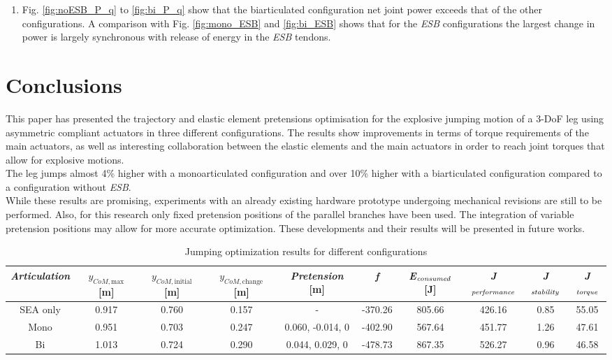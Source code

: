 \documentclass[letterpaper, 10 pt, conference]{ieeeconf}  %
\begin{document}
\begin{enumerate}
		\item Fig. \ref{fig:noESB_P_q} to \ref{fig:bi_P_q} show that the biarticulated configuration net joint power exceeds that of the other configurations. A comparison with Fig. \ref{fig:mono_ESB} and \ref{fig:bi_ESB} shows that for the \textit{ESB} configurations the largest change in power is largely synchronous with release of energy in the \textit{ESB} tendons.
	\end{enumerate}
	
	\section{Conclusions} \label{sec:conclusions} 
	
	This paper has presented the trajectory and elastic element pretensions optimisation for the explosive jumping motion of a 3-DoF leg using asymmetric compliant actuators in three different configurations. The results show improvements in terms of torque requirements of the main actuators, as well as interesting collaboration between the elastic elements and the main actuators in order to reach joint torques that allow for explosive motions.\\
	The leg jumps almost 4\% higher with a monoarticulated configuration and over 10\% higher with a biarticulated configuration compared to a configuration without \textit{ESB}.\\
	While these results are promising, experiments with an already existing hardware prototype undergoing mechanical revisions are still to be performed. Also, for this research only fixed pretension positions of the parallel branches have been used. The integration of variable pretension positions may allow for more accurate optimization. These developments and their results will be presented in future works.
	
	\begin{table}[ht]
		\caption{Jumping optimization results for different configurations}
		\label{maxheight}
		\begin{center}
			\begin{tabular}[t]{c|c|c||c|c|c|c|c|c|c}
				\textit{Articulation} &  $y_{CoM,\text{max}}$ [m] & $y_{CoM,\text{initial}}$ [m]& $y_{CoM,\text{change}}$ [m]& \textit{Pretension} [m] & \textit{f} & \textit{E}$_{\text{\textit{consumed}}}$ [J] & \textit{J}$_{\text{\textit{performance}}}$ & \textit{J}$_{\text{\textit{stability}}}$ & \textit{J}$_{\text{\textit{torque}}}$\\ 
				\hline
				SEA only& 0.917 &0.760  &0.157 &- &-370.26  & 805.66 & 426.16  &0.85  &   55.05\\
				\hline
				Mono &0.951 &0.703 &0.247 &  0.060, -0.014, 0  & -402.90 & 567.64& 451.77 & 1.26 &47.61 \\
				\hline
				Bi &1.013 &0.724 &0.290 &  0.044, 0.029, 0 & -478.73 & 867.35 & 526.27 & 0.96 & 46.58
			\end{tabular}
		\end{center}
	\end{table}
	
\end{document}
